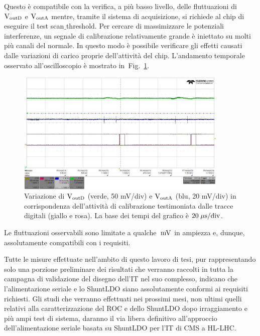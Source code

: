 Questo \`e compatibile con la verifica, a pi\`u basso livello, delle fluttuazioni di $\mathrm{V_{outD}}$ e $\mathrm{V_{outA}}$ mentre, tramite il sistema di acquisizione, si richiede al chip di eseguire il test scan$\_$threshold. Per cercare di massimizzare le potenziali interferenze, un segnale di calibrazione relativamente grande \`e iniettato su molti pi\`u canali del normale. In questo modo è possibile verificare gli effetti causati dalle variazioni di carico proprie dell'attività del chip. L'andamento temporale osservato all'oscilloscopio \`e mostrato in~Fig.~\ref{alllin2}.
\begin{figure}
\centering

\includegraphics[width=0.9\textwidth]{Immagini/alllin2}
\caption{Variazione di $\mathrm{V_{outD}}$ (verde, 50 mV/div) e $\mathrm{V_{outA}}$ (blu, 20 mV/div) in corrispondenza dell'attivit\`a di calibrazione testimoniata dalle tracce digitali (giallo e rosa). La base dei tempi del grafico \`e $\mathrm{20\; \mu \rm s/div}$.}
\label{alllin2}

\end{figure}
Le fluttuazioni osservabili sono limitate a qualche $\rm \; mV$ in ampiezza e, dunque, assolutamente compatibili con i requisiti.

Tutte le misure effettuate nell'ambito di questo lavoro di tesi, pur rappresentando solo una porzione preliminare dei risultati che verranno raccolti in tutta la campagna di validazione del disegno dell'IT nel suo complesso, indicano che l'alimentazione seriale e lo ShuntLDO siano assolutamente conformi ai requisiti richiesti. Gli studi che verranno effettuati nei prossimi mesi, non ultimi quelli relativi alla caratterizzazione del ROC e dello ShuntLDO dopo irraggiamento e pi\`u ampi test di sistema, daranno il via libera definitivo all'approccio dell'alimentazione seriale basata su ShuntLDO per l'IT di CMS a HL-LHC. 


